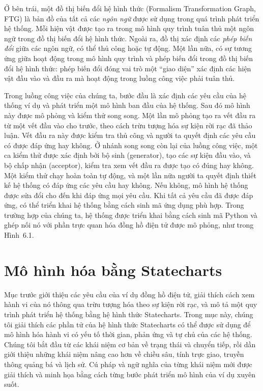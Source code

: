 Ở bên trái, một đồ thị biến đổi hệ hình thức (Formalism Transformation Graph, FTG) là bản đồ của tất cả các \emph{ngôn ngữ} được sử dụng trong quá trình phát triển hệ thống. Mỗi hiện vật được tạo ra trong mô hình quy trình tuân thủ một ngôn ngữ trong đồ thị biến đổi hệ hình thức. Ngoài ra, đồ thị xác định các \emph{phép biến đổi} giữa các ngôn ngữ, có thể thủ công hoặc tự động. Một lần nữa, có sự tương ứng giữa hoạt động trong mô hình quy trình và phép biến đổi trong đồ thị biến đổi hệ hình thức: phép biến đổi đóng vai trò một ``giao diện'' xác định các hiện vật đầu vào và đầu ra mà hoạt động trong luồng công việc phải tuân thủ.

Trong luồng công việc của chúng ta, bước đầu là xác định các yêu cầu của hệ thống ví dụ và phát triển một mô hình ban đầu của hệ thống. Sau đó mô hình này được mô phỏng và kiểm thử song song. Một lần mô phỏng tạo ra vết đầu ra từ một vết đầu vào cho trước, theo cách trừu tượng hóa sự kiện rời rạc đã thảo luận. Vết đầu ra này được kiểm tra thủ công và người ta quyết định các yêu cầu có được đáp ứng hay không. Ở nhánh song song còn lại của luồng công việc, một ca kiểm thử được xác định bởi bộ sinh (generator), tạo các sự kiện đầu vào, và bộ chấp nhận (acceptor), kiểm tra xem vết đầu ra được tạo có đúng hay không. Một kiểm thử chạy hoàn toàn tự động, và một lần nữa người ta quyết định thiết kế hệ thống có đáp ứng các yêu cầu hay không. Nếu không, mô hình hệ thống được sửa đổi cho đến khi đáp ứng mọi yêu cầu. Khi tất cả yêu cầu đã được đáp ứng, có thể triển khai hệ thống bằng cách sinh mã ứng dụng phù hợp. Trong trường hợp của chúng ta, hệ thống được triển khai bằng cách sinh mã Python và ghép nối nó với phần trực quan hóa đồng hồ điện tử được mô phỏng, như trong Hình~6.1.

\section{Mô hình hóa bằng Statecharts}
Mục trước giới thiệu các yêu cầu của ví dụ đồng hồ điện tử, giải thích cách xem hành vi của nó thông qua trừu tượng hóa theo sự kiện rời rạc, và mô tả một quy trình phát triển hệ thống bằng hệ hình thức Statecharts. Trong mục này, chúng tôi giải thích các phần tử của hệ hình thức Statecharts có thể được sử dụng để mô hình hóa hành vi có yếu tố thời gian, phản ứng và tự chủ của các hệ thống. Chúng tôi bắt đầu từ các khái niệm cơ bản về trạng thái và chuyển tiếp, rồi dần giới thiệu những khái niệm nâng cao hơn về chiều sâu, tính trực giao, truyền thông quảng bá và lịch sử. Cú pháp và ngữ nghĩa của từng khái niệm mới được giải thích và minh họa bằng cách từng bước phát triển mô hình của ví dụ xuyên suốt.

